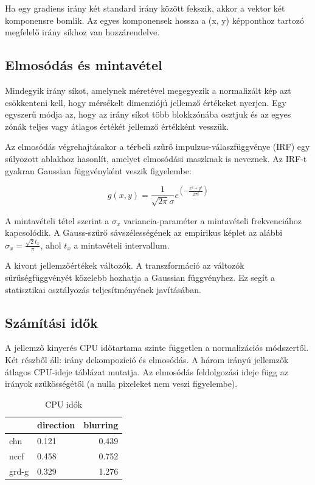 Ha egy gradiens irány két standard irány között fekszik, akkor a vektor két komponensre bomlik. Az egyes komponensek hossza a (x, y) képponthoz tartozó megfelelő irány síkhoz van hozzárendelve.

\subsection{Elmosódás és mintavétel}

Mindegyik irány síkot, amelynek méretével megegyezik a normalizált kép azt csökkenteni kell, hogy mérsékelt dimenziójú jellemző értékeket nyerjen. Egy egyszerű módja az, hogy az irány síkot több blokkzónába osztjuk és az egyes zónák teljes vagy átlagos értékét jellemző értékként vesszük.

Az elmosódás végrehajtásakor a térbeli szűrő impulzus-válaszfüggvénye (IRF) egy súlyozott ablakhoz hasonlít, amelyet elmosódási maszknak is neveznek. Az IRF-t gyakran Gaussian függvényként veszik figyelembe:

$$
g(x,y) = \frac{1}{\sqrt{2\pi}\sigma} e^{{(- \frac{x^2 + y^2}{2 \sigma_x^2})}}
$$

A mintavételi tétel szerint a $\sigma_x$ variancia-paraméter a mintavételi frekvenciához kapcsolódik. A Gauss-szűrő sávszélességének az empirikus képlet az alábbi $\sigma_x = \frac{\sqrt{2}t_x}{\pi}$, ahol $t_x$ a mintavételi intervallum.

A kivont jellemzőértékek változók. A transzformáció az változók sűrűségfüggvényét közelebb hozhatja a Gaussian függvényhez. Ez segít a statisztikai osztályozás teljesítményének javításában.

\subsection{Számítási idők}
A jellemző kinyerés CPU időtartama szinte független a normalizációs módszertől. Két részből áll: irány dekompozíció és elmosódás. A három irányú jellemzők átlagos CPU-ideje
 táblázat mutatja. Az elmosódás feldolgozási ideje függ az irányok szűkösségétől (a nulla pixeleket nem veszi figyelembe).

\begin{table}[h]
\centering
\caption{CPU idők}
\label{cpu_times}
\begin{tabular}{|l|l|r|}
\hline
\multicolumn{1}{|c|}{} & direction & blurring \\ \hline
chn                    & 0.121     & 0.439    \\ \hline
nccf                   & 0.458     & 0.752    \\ \hline
grd-g                  & 0.329     & 1.276    \\ \hline
\end{tabular}
\end{table}

